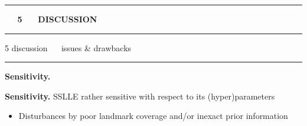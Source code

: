 \documentclass[11pt, compress, t, notes = noshow, xcolor = table, 
aspectratio = 1610]{beamer}
\newcommand{\highlight}[1]{\textcolor{highlightcol}{\textbf{#1}}}
\newcommand{\arritem}{\item[\highlight{$\rightarrow$}]}
\newcommand{\flexitem}[1]{\item[$\highlight{#1}$]}
\begin{document}

% 
% 


\LARGE
\begin{frame}{\phantom{foo}}
\normalsize
\vspace{-0.5cm}
\noindent \textcolor{gray!90}{\rule{\textwidth}{1pt}}
\smallskip

\Huge
\hspace{0pt}
\vfill
\textbf{\highlight{~~ 5 ~~ DISCUSSION}}
\vfill
\hspace{0pt}

\noindent \textcolor{gray!90}{\rule{\textwidth}{1pt}}

\end{frame}


\LARGE
\begin{frame}{\textcolor{gray!90}{5 discussion} ~~ issues \& drawbacks}
\normalsize
\vspace{-0.5cm}
\noindent \textcolor{gray!90}{\rule{\textwidth}{1pt}}
\smallskip

\textbf{Sensitivity.} 

\textbf{Sensitivity.} SSLLE rather sensitive with respect to its
(hyper)parameters

\begin{itemize}
  \arritem Disturbances by poor landmark coverage and/or inexact prior 
  information 
\end{itemize}

\vspace{0.3cm}

\end{frame}
\end{document}
